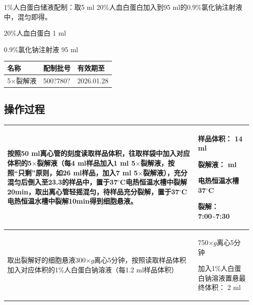 \documentclass[UTF8,10pt,a4paper,fontset=fandol]{ctexart}
\newcommand{\fieldvalue}[1]{#1}
\newcommand{\handwritten}[1]{#1}
\begin{document}
1\%人白蛋白储液配制：取5 ml 20\%人血白蛋白加入到95 ml的0.9\%氯化钠注射液中，混匀即得。

20\%人血白蛋白\quad
\fieldvalue{\handwritten{1}} ml

0.9\%氯化钠注射液\quad
\fieldvalue{\handwritten{95}} ml

\begin{center}
\begin{tabular}{|p{3.0cm}|p{5.0cm}|p{4.0cm}|}
\hline
名称 & 配制批号 & 有效期至 \\
\hline
5$\times$裂解液 &
\fieldvalue{\handwritten{500?780?}} &
\fieldvalue{\handwritten{2026.01.28}}
\\
\hline
\end{tabular}
\end{center}

\subsection*{操作过程}

\begin{tabular}{|p{8.5cm}|p{5.0cm}|}
\hline
按照50 ml离心管的刻度读取样品体积，往取样袋中加入对应体积的5$\times$裂解液（每4 ml样品加入1 ml 5$\times$裂解液，按照“只剩”原则，如26 ml样品，加入7 ml 5$\times$裂解液），充分混匀后倒入至23.3的样品中，置于37$^\circ$C电热恒温水槽中裂解20min，取出离心管轻摇混匀，待样品充分裂解，置于37$^\circ$C电热恒温水槽中裂解10min得到细胞悬液。 &
样品体积：
\fieldvalue{\handwritten{14}} ml

裂解液：
ml

电热恒温水槽
\fieldvalue{\handwritten{37}}$^\circ$C

裂解：
\fieldvalue{\handwritten{7{:}00\textasciitilde7{:}30}}
\\
\hline
取出裂解好的细胞悬液300$\times g$离心5分钟，按照读取样品体积加入对应体积的1\%人白蛋白钠溶液（每1.2 ml样品体积） &
\fieldvalue{\handwritten{750$\times g$}}离心5分钟

加入1\%人白蛋白钠溶液置悬最终体积：
\fieldvalue{\handwritten{2}} ml
\\
\hline
\end{tabular}
\end{document}
